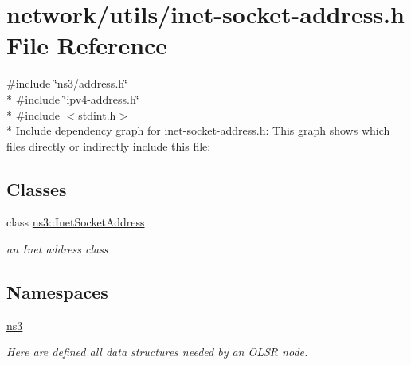 \hypertarget{inet-socket-address_8h}{}\section{network/utils/inet-\/socket-\/address.h File Reference}
\label{inet-socket-address_8h}
{\ttfamily \#include \char`\"{}ns3/address.\+h\char`\"{}}\\*
{\ttfamily \#include \char`\"{}ipv4-\/address.\+h\char`\"{}}\\*
{\ttfamily \#include $<$stdint.\+h$>$}\\*
Include dependency graph for inet-\/socket-\/address.h\+:
This graph shows which files directly or indirectly include this file\+:
\subsection*{Classes}
\begin{DoxyCompactItemize}
\item 
class \hyperlink{classns3_1_1InetSocketAddress}{ns3\+::\+Inet\+Socket\+Address}
\begin{DoxyCompactList}\small\item\em an Inet address class \end{DoxyCompactList}\end{DoxyCompactItemize}
\subsection*{Namespaces}
\begin{DoxyCompactItemize}
\item 
 \hyperlink{namespacens3}{ns3}
\begin{DoxyCompactList}\small\item\em Here are defined all data structures needed by an O\+L\+SR node. \end{DoxyCompactList}\end{DoxyCompactItemize}
